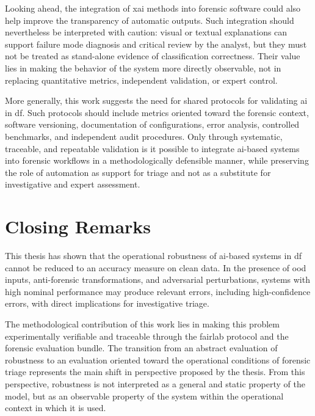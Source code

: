 Looking ahead, the integration of \gls{xai} methods into forensic software
could also help improve the transparency of automatic outputs. Such integration
should nevertheless be interpreted with caution: visual or textual explanations
can support failure mode diagnosis and critical review by the analyst, but they
must not be treated as stand-alone evidence of classification correctness.
Their value lies in making the behavior of the system more directly observable,
not in replacing quantitative metrics, independent validation, or expert
control.

More generally, this work suggests the need for shared protocols for validating
\gls{ai} in \gls{df}. Such protocols should include metrics oriented toward the
forensic context, software versioning, documentation of configurations, error
analysis, controlled benchmarks, and independent audit procedures. Only through
systematic, traceable, and repeatable validation is it possible to integrate
\gls{ai}-based systems into forensic workflows in a methodologically defensible
manner, while preserving the role of automation as support for triage and not
as a substitute for investigative and expert assessment.

\section{Closing Remarks}
\label{sec:conclusions-closing}

This thesis has shown that the operational robustness of \gls{ai}-based systems
in \gls{df} cannot be reduced to an accuracy measure on clean data. In the
presence of \gls{ood} inputs, anti-forensic transformations, and adversarial
perturbations, systems with high nominal performance may produce relevant
errors, including high-confidence errors, with direct implications for
investigative triage.

The methodological contribution of this work lies in making this problem
experimentally verifiable and traceable through the \gls{fairlab} protocol and
the forensic evaluation bundle. The transition from an abstract evaluation of
robustness to an evaluation oriented toward the operational conditions of
forensic triage represents the main shift in perspective proposed by the
thesis. From this perspective, robustness is not interpreted as a general and
static property of the model, but as an observable property of the system within
the operational context in which it is used.


